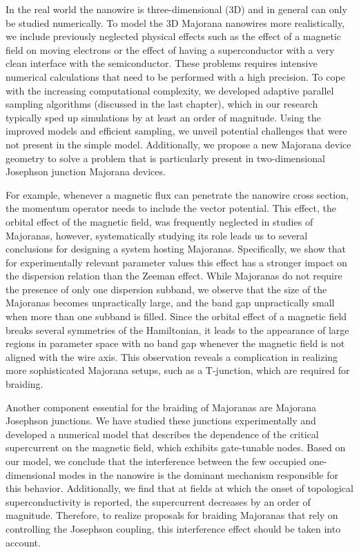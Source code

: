 In the real world the nanowire is three-dimensional (3D) and in general can only be studied numerically.
To model the 3D Majorana nanowires more realistically, we include previously neglected physical effects such as the effect of a magnetic field on moving electrons or the effect of having a superconductor with a very clean interface with the semiconductor.
These problems requires intensive numerical calculations that need to be performed with a high precision.
To cope with the increasing computational complexity, we developed adaptive parallel sampling algorithms (discussed in the last chapter), which in our research typically sped up simulations by at least an order of magnitude.
Using the improved models and efficient sampling, we unveil potential challenges that were not present in the simple model.
Additionally, we propose a new Majorana device geometry to solve a problem that is particularly present in two-dimensional Josephson junction Majorana devices.

For example, whenever a magnetic flux can penetrate the nanowire cross section, the momentum operator needs to include the vector potential.
This effect, the orbital effect of the magnetic field, was frequently neglected in studies of Majoranas, however, systematically studying its role leads us to several conclusions for designing a system hosting Majoranas.
Specifically, we show that for experimentally relevant parameter values this effect has a stronger impact on the dispersion relation than the Zeeman effect.
While Majoranas do not require the presence of only one dispersion subband, we observe that the size of the Majoranas becomes unpractically large, and the band gap unpractically small when more than one subband is filled.
Since the orbital effect of a magnetic field breaks several symmetries of the Hamiltonian, it leads to the appearance of large regions in parameter space with no band gap whenever the magnetic field is not aligned with the wire axis.
This observation reveals a complication in realizing more sophisticated Majorana setups, such as a T-junction, which are required for braiding.

Another component essential for the braiding of Majoranas are Majorana Josephson junctions.
We have studied these junctions experimentally and developed a numerical model that describes the dependence of the critical supercurrent on the magnetic field, which exhibits gate-tunable nodes.
Based on our model, we conclude that the interference between the few occupied one-dimensional modes in the nanowire is the dominant mechanism responsible for this behavior.
Additionally, we find that at fields at which the onset of topological superconductivity is reported, the supercurrent decreases by an order of magnitude.
Therefore, to realize proposals for braiding Majoranas that rely on controlling the Josephson coupling, this interference effect should be taken into account.

